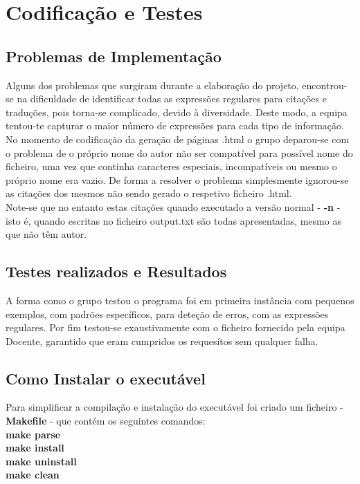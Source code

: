 \documentclass[11pt,a4paper]{report}%
\begin{document}
\chapter{Codificação e Testes}
\section{Problemas de Implementação}
Alguns dos problemas que surgiram durante a elaboração do projeto, encontrou-se na dificuldade de identificar todas as expressões regulares para citações e traduções, pois torna-se complicado, devido à diversidade. Deste modo, a equipa tentou-te capturar o maior número de expressões para cada tipo de informação.\\

No momento de codificação da geração de páginas .html o grupo deparou-se com o problema de o próprio nome do autor não ser compatível para possível nome do ficheiro, uma vez que continha caracteres especiais, incompatíveis ou mesmo o próprio nome era vazio. De forma a resolver o problema simplesmente ignorou-se as citações dos mesmos não sendo gerado o respetivo ficheiro .html.\\
Note-se que no entanto estas citações quando executado a versão normal - \textbf{-n} - isto é, quando escritas no ficheiro output.txt são todas apresentadas, mesmo as que não têm autor.

\section{Testes realizados e Resultados}
A forma como o grupo testou o programa foi em primeira instância com pequenos exemplos, com padrões específicos, para deteção de erros, com as expressões regulares. Por fim testou-se exaustivamente com o ficheiro fornecido pela equipa Docente, garantido que eram cumpridos os requesítos sem qualquer falha.


\section{Como Instalar o executável}

Para simplificar a compilação e instalação do executável foi criado um ficheiro -  \textbf{Makefile} - que contém os seguintes comandos:\\

\textbf{make parse\\
make install\\
make uninstall\\
make clean\\}
\end{document}
